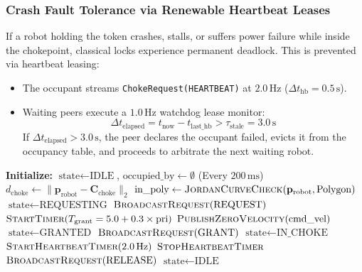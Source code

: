 \documentclass[10pt,twocolumn,a4paper]{article}
\theoremstyle{definition}
\begin{document}
\subsubsection{Crash Fault Tolerance via Renewable Heartbeat Leases}
If a robot holding the token crashes, stalls, or suffers power failure while inside the chokepoint, classical locks experience permanent deadlock. This is prevented via heartbeat leasing:
\begin{itemize}
    \item The occupant streams \texttt{ChokeRequest(HEARTBEAT)} at $2.0\,\text{Hz}$ ($\Delta t_{\text{hb}} = 0.5\,\text{s}$).
    \item Waiting peers execute a $1.0\,\text{Hz}$ watchdog lease monitor:
    \begin{equation}
        \Delta t_{\text{elapsed}} = t_{\text{now}} - t_{\text{last\_hb}} > \tau_{\text{stale}} = 3.0\,\text{s}
    \end{equation}
    If $\Delta t_{\text{elapsed}} > 3.0\,\text{s}$, the peer declares the occupant failed, evicts it from the occupancy table, and proceeds to arbitrate the next waiting robot.
\end{itemize}

\begin{algorithm}[t]
\caption{Distributed Chokepoint State Machine with Leasing}
\begin{algorithmic}[1]
\State \textbf{Initialize:} $\text{state} \gets \text{IDLE}$, $\text{occupied\_by} \gets \emptyset$
\Loop \quad (Every $200\,\text{ms}$)
    \State $d_{\text{choke}} \gets \|\mathbf{p}_{\text{robot}} - \mathbf{C}_{\text{choke}}\|_2$
    \State $\text{in\_poly} \gets \Call{JordanCurveCheck}{\mathbf{p}_{\text{robot}}, \text{Polygon}}$
        \State $\text{state} \gets \text{REQUESTING}$
        \State $\Call{BroadcastRequest}{\text{REQUEST}}$
        \State $\Call{StartTimer}{T_{\text{grant}} = 5.0 + 0.3 \times \text{pri}}$
            \State $\Call{PublishZeroVelocity}{\text{cmd\_vel}}$ 
        \EndIf
            \State $\text{state} \gets \text{GRANTED}$
            \State $\Call{BroadcastRequest}{\text{GRANT}}$
        \EndIf
        \State $\text{state} \gets \text{IN\_CHOKE}$
        \State $\Call{StartHeartbeatTimer}{2.0\,\text{Hz}}$
        \State $\Call{StopHeartbeatTimer}{}$
        \State $\Call{BroadcastRequest}{\text{RELEASE}}$
        \State $\text{state} \gets \text{IDLE}$
    \EndIf
    \State {}
\EndLoop
\end{algorithmic}
\end{algorithm}
\end{document}
